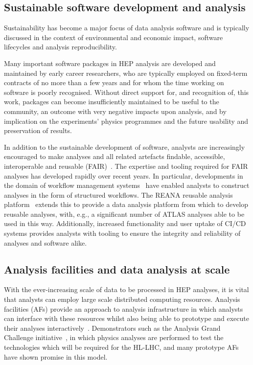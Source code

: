 \documentclass[10pt,a4paper]{article}
\begin{document}
\subsection{Sustainable software development and
analysis}\label{sustainable-software-development-and-analysis}

Sustainability has become a major focus of data analysis software and is
typically discussed in the context of environmental and economic impact,
software lifecycles and analysis reproducibility.

Many important software packages in HEP analysis are developed and
maintained by early career researchers, who are typically employed on
fixed-term contracts of no more than a few years and for whom the time
working on software is poorly recognised. Without direct support for,
and recognition of, this work, packages can become insufficiently
maintained to be useful to the community, an outcome with very negative
impacts upon analysis, and by implication on the experiments' physics
programmes and the future usability and preservation of results.

In addition to the sustainable development of software, analysts are
increasingly encouraged to make analyses and all related artefacts
findable, accessible, interoperable and reusable
(FAIR)~\cite{fairguiding,Chen_2022,Duarte:2022job,Fair4AIWorkshop}.
The expertise and tooling required for FAIR analyses has developed
rapidly over recent years. In particular, developments in the domain of
workflow management systems~\cite{cwl,snakemake,luigilaw,yadage} have enabled
analysts to construct analyses in the form of structured workflows. The
REANA reusable analysis platform~\cite{REANA} extends this to provide
a data analysis platform from which to develop reusable analyses, with,
e.g., a significant number of ATLAS analyses able to be used in this
way. Additionally, increased functionality and user uptake of CI/CD
systems provides analysts with tooling to ensure the integrity and
reliability of analyses and software alike.

\subsection{Analysis facilities and data analysis at
scale}\label{analysis-facilities-and-data-analysis-at-scale}

With the ever-increasing scale of data to be processed in HEP analyses,
it is vital that analysts can employ large scale distributed computing
resources. Analysis facilities (AFs) provide an approach to analysis
infrastructure in which analysts can interface with these resources
whilst also being able to prototype and execute their analyses
interactively~\cite{AF WP}. Demonstrators such as the Analysis Grand
Challenge initiative~\cite{https://doi.org/10.22323/1.414.0235}, in which physics analyses are performed to
test the technologies which will be required for the HL-LHC, and many
prototype AFs~\cite{AF pilot ref?} have shown promise in this model.
\end{document}
